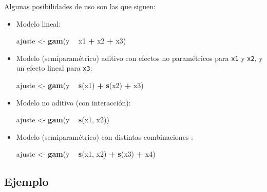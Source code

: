 \documentclass[
  spanish,
]{book}
\newenvironment{Shaded}{\begin{snugshade}}{\end{snugshade}}
\newcommand{\KeywordTok}[1]{\textcolor[rgb]{0.13,0.29,0.53}{\textbf{#1}}}
\newcommand{\NormalTok}[1]{#1}
\newcommand{\OperatorTok}[1]{\textcolor[rgb]{0.81,0.36,0.00}{\textbf{#1}}}
\newcommand{\StringTok}[1]{\textcolor[rgb]{0.31,0.60,0.02}{#1}}
\theoremstyle{break}
\theoremstyle{definition}
\theoremstyle{definition}
\theoremstyle{definition}
\theoremstyle{remark}
\begin{document}
Algunas posibilidades de uso son las que siguen:

\begin{itemize}
\item
  Modelo lineal:

\begin{Shaded}
\begin{Highlighting}[]
\NormalTok{ajuste <-}\StringTok{ }\KeywordTok{gam}\NormalTok{(y }\OperatorTok{~}\StringTok{ }\NormalTok{x1 }\OperatorTok{+}\StringTok{ }\NormalTok{x2 }\OperatorTok{+}\StringTok{ }\NormalTok{x3)}
\end{Highlighting}
\end{Shaded}
\item
  Modelo (semiparamétrico) aditivo con efectos no paramétricos para \texttt{x1} y \texttt{x2}, y un efecto lineal para \texttt{x3}:

\begin{Shaded}
\begin{Highlighting}[]
\NormalTok{ajuste <-}\StringTok{ }\KeywordTok{gam}\NormalTok{(y }\OperatorTok{~}\StringTok{ }\KeywordTok{s}\NormalTok{(x1) }\OperatorTok{+}\StringTok{ }\KeywordTok{s}\NormalTok{(x2) }\OperatorTok{+}\StringTok{ }\NormalTok{x3)}
\end{Highlighting}
\end{Shaded}
\item
  Modelo no aditivo (con interacción):

\begin{Shaded}
\begin{Highlighting}[]
\NormalTok{ajuste <-}\StringTok{ }\KeywordTok{gam}\NormalTok{(y }\OperatorTok{~}\StringTok{ }\KeywordTok{s}\NormalTok{(x1, x2))}
\end{Highlighting}
\end{Shaded}
\item
  Modelo (semiparamétrico) con distintas combinaciones :

\begin{Shaded}
\begin{Highlighting}[]
\NormalTok{ajuste <-}\StringTok{ }\KeywordTok{gam}\NormalTok{(y }\OperatorTok{~}\StringTok{ }\KeywordTok{s}\NormalTok{(x1, x2) }\OperatorTok{+}\StringTok{ }\KeywordTok{s}\NormalTok{(x3) }\OperatorTok{+}\StringTok{ }\NormalTok{x4)}
\end{Highlighting}
\end{Shaded}
\end{itemize}

\hypertarget{ejemplo-3}{%
\subsection{Ejemplo}\label{ejemplo-3}}
\end{document}
